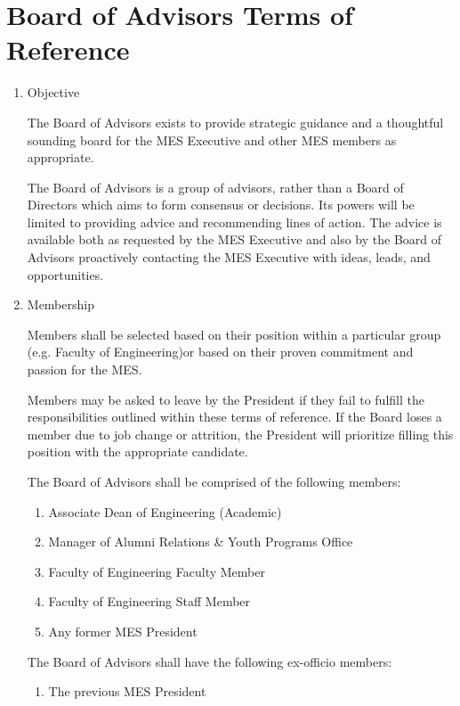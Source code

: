 \section{Board of Advisors Terms of Reference}
\label{board-of-advisors-terms-of-reference}

\begin{enumerate}
 \item
  Objective

  The Board of Advisors exists to provide strategic guidance and a thoughtful sounding board for the MES Executive and other MES members as appropriate.

  The Board of Advisors is a group of advisors, rather than a Board of Directors which aims to form consensus or decisions. Its powers will be limited to providing advice and recommending lines of action. The advice is available both as requested by the MES Executive and also by the Board of Advisors proactively contacting the MES Executive with ideas, leads, and opportunities.

 \item
  Membership

  Members shall be selected based on their position within a particular group (e.g. Faculty of Engineering)or based on their proven commitment and passion for the MES.

  Members may be asked to leave by the President if they fail to fulfill the responsibilities outlined within these terms of reference. If the Board loses a member due to job change or attrition, the President will prioritize filling this position with the appropriate candidate.

  The Board of Advisors shall be comprised of the following members:

  \begin{enumerate}
   \item
    Associate Dean of Engineering (Academic)
   \item
    Manager of Alumni Relations \& Youth Programs Office
   \item
    Faculty of Engineering Faculty Member
   \item
    Faculty of Engineering Staff Member
   \item
    Any former MES President
  \end{enumerate}

  The Board of Advisors shall have the following ex-officio members:

  \begin{enumerate}
   \item
    The previous MES President
  \end{enumerate}


\end{enumerate}

